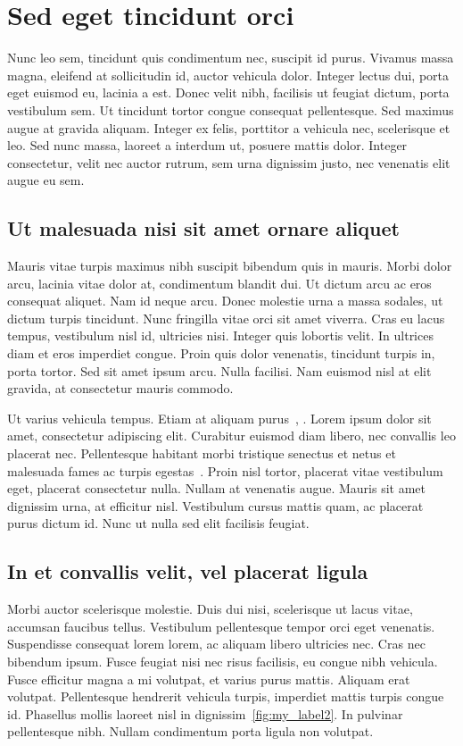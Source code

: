 \chapter{Sed eget tincidunt orci}

Nunc leo sem, tincidunt quis condimentum nec, suscipit id purus. Vivamus massa magna, eleifend at sollicitudin id, auctor vehicula dolor. Integer lectus dui, porta eget euismod eu, lacinia a est. Donec velit nibh, facilisis ut feugiat dictum, porta vestibulum sem. Ut tincidunt tortor congue consequat pellentesque. Sed maximus augue at gravida aliquam. Integer ex felis, porttitor a vehicula nec, scelerisque et leo. Sed nunc massa, laoreet a interdum ut, posuere mattis dolor. Integer consectetur, velit nec auctor rutrum, sem urna dignissim justo, nec venenatis elit augue eu sem.
\section{Ut malesuada nisi sit amet ornare aliquet}
Mauris vitae turpis maximus nibh suscipit bibendum quis in mauris. Morbi dolor arcu, lacinia vitae dolor at, condimentum blandit dui. Ut dictum arcu ac eros consequat aliquet. Nam id neque arcu. Donec molestie urna a massa sodales, ut dictum turpis tincidunt. Nunc fringilla vitae orci sit amet viverra. Cras eu lacus tempus, vestibulum nisl id, ultricies nisi. Integer quis lobortis velit. In ultrices diam et eros imperdiet congue. Proin quis dolor venenatis, tincidunt turpis in, porta tortor. Sed sit amet ipsum arcu. Nulla facilisi. Nam euismod nisl at elit gravida, at consectetur mauris commodo.

Ut varius vehicula tempus. Etiam at aliquam purus~\cite{Afanasyev92}, \cite{Razumovski}. Lorem ipsum dolor sit amet, consectetur adipiscing elit. Curabitur euismod diam libero, nec convallis leo placerat nec. Pellentesque habitant morbi tristique senectus et netus et malesuada fames ac turpis egestas~\cite{Lagkueva}. Proin nisl tortor, placerat vitae vestibulum eget, placerat consectetur nulla. Nullam at venenatis augue. Mauris sit amet dignissim urna, at efficitur nisl. Vestibulum cursus mattis quam, ac placerat purus dictum id. Nunc ut nulla sed elit facilisis feugiat.
\section{In et convallis velit, vel placerat ligula}
Morbi auctor scelerisque molestie. Duis dui nisi, scelerisque ut lacus vitae, accumsan faucibus tellus. Vestibulum pellentesque tempor orci eget venenatis. Suspendisse consequat lorem lorem, ac aliquam libero ultricies nec. Cras nec bibendum ipsum. Fusce feugiat nisi nec risus facilisis, eu congue nibh vehicula. Fusce efficitur magna a mi volutpat, et varius purus mattis. Aliquam erat volutpat. Pellentesque hendrerit vehicula turpis, imperdiet mattis turpis congue id. Phasellus mollis laoreet nisl in dignissim~\ref{fig:my_label2}. In pulvinar pellentesque nibh. Nullam condimentum porta ligula non volutpat.

